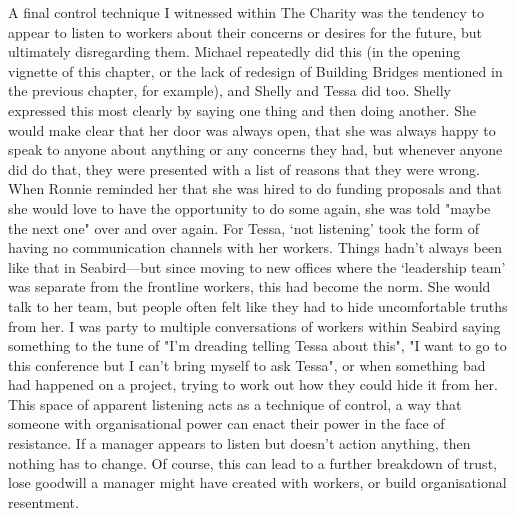 A final control technique I witnessed within The Charity was the tendency to appear to listen to workers about their concerns or desires for the future, but ultimately disregarding them. Michael repeatedly did this (in the opening vignette of this chapter, or the lack of redesign of Building Bridges mentioned in the previous chapter, for example), and Shelly and Tessa did too. Shelly expressed this most clearly by saying one thing and then doing  another. She would make clear that her door was always open, that she was always happy to speak to anyone about anything or any concerns they had, but whenever anyone did do that, they were presented with a list of reasons that they were wrong. When Ronnie reminded her that she was hired to do funding proposals and that she would love to have the opportunity to do some again, she was told "maybe the next one" over and over again. For Tessa, ‘not listening’ took the form of having no communication channels with her workers. Things hadn’t always been like that in Seabird—but since moving to new offices where the ‘leadership team’ was separate from the frontline workers, this had become the norm. She would talk to her team, but people often felt like they had to hide uncomfortable truths from her. I was party to multiple conversations of workers within Seabird saying something to the tune of "I'm dreading telling Tessa about this", "I want to go to this conference but I can't bring myself to ask Tessa", or when something bad had happened on a project, trying to work out how they could hide it from her. This space of apparent listening acts as a technique of control, a way that someone with organisational power can enact their power in the face of resistance. If a manager appears to listen but doesn't action anything, then nothing has to change. Of course, this can lead to a further breakdown of trust, lose goodwill a manager might have created with workers, or build organisational resentment.

